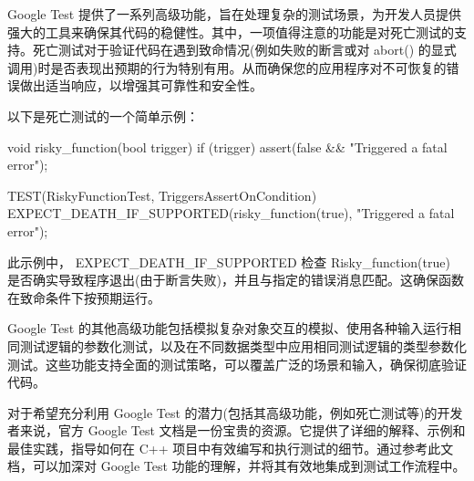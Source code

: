 Google Test 提供了一系列高级功能，旨在处理复杂的测试场景，为开发人员提供强大的工具来确保其代码的稳健性。其中，一项值得注意的功能是对死亡测试的支持。死亡测试对于验证代码在遇到致命情况(例如失败的断言或对 abort() 的显式调用)时是否表现出预期的行为特别有用。从而确保您的应用程序对不可恢复的错误做出适当响应，以增强其可靠性和安全性。

以下是死亡测试的一个简单示例：

\begin{cpp}
void risky_function(bool trigger) {
    if (trigger) {
        assert(false && "Triggered a fatal error");
    }
}

TEST(RiskyFunctionTest, TriggersAssertOnCondition) {
    EXPECT_DEATH_IF_SUPPORTED(risky_function(true), "Triggered a fatal error");
}
\end{cpp}

此示例中， EXPECT\_DEATH\_IF\_SUPPORTED 检查 Risky\_function(true) 是否确实导致程序退出(由于断言失败)，并且与指定的错误消息匹配。这确保函数在致命条件下按预期运行。

Google Test 的其他高级功能包括模拟复杂对象交互的模拟、使用各种输入运行相同测试逻辑的参数化测试，以及在不同数据类型中应用相同测试逻辑的类型参数化测试。这些功能支持全面的测试策略，可以覆盖广泛的场景和输入，确保彻底验证代码。

对于希望充分利用 Google Test 的潜力(包括其高级功能，例如死亡测试等)的开发者来说，官方 Google Test 文档是一份宝贵的资源。它提供了详细的解释、示例和最佳实践，指导如何在 C++ 项目中有效编写和执行测试的细节。通过参考此文档，可以加深对 Google Test 功能的理解，并将其有效地集成到测试工作流程中。
